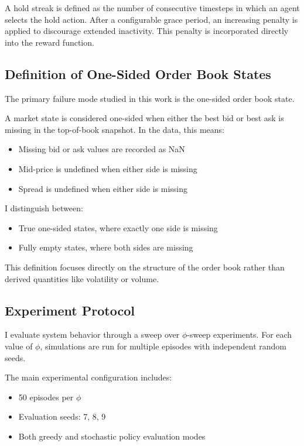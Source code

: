 \documentclass[sigconf]{acmart}
\begin{document}
A hold streak is defined as the number of consecutive timesteps in which an agent selects the hold action. After a configurable grace period, an increasing penalty is applied to discourage extended inactivity. This penalty is incorporated directly into the reward function.

\subsection{Definition of One-Sided Order Book States}

The primary failure mode studied in this work is the one-sided order book state.

A market state is considered one-sided when either the best bid or best ask is missing in the top-of-book snapshot. In the data, this means:
\begin{itemize}[leftmargin=1.5em]
    \item Missing bid or ask values are recorded as NaN
    \item Mid-price is undefined when either side is missing
    \item Spread is undefined when either side is missing
\end{itemize}

I distinguish between:
\begin{itemize}[leftmargin=1.5em]
    \item True one-sided states, where exactly one side is missing
    \item Fully empty states, where both sides are missing
\end{itemize}

This definition focuses directly on the structure of the order book rather than derived quantities like volatility or volume.

\subsection{Experiment Protocol}

I evaluate system behavior through a sweep over $\phi$-sweep experiments. For each value of $\phi$, simulations are run for multiple episodes with independent random seeds.

The main experimental configuration includes:
\begin{itemize}[leftmargin=1.5em]
    \item 50 episodes per $\phi$
    \item Evaluation seeds: 7, 8, 9
    \item Both greedy and stochastic policy evaluation modes
\end{itemize}
\end{document}
